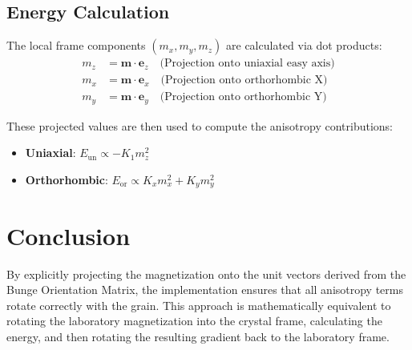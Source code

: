 \documentclass[11pt]{article}
\begin{document}
\subsection{Energy Calculation}
The local frame components $(m_x, m_y, m_z)$ are calculated via dot products:
\begin{align}
    m_z &= \mathbf{m} \cdot \mathbf{e}_z \quad \text{(Projection onto uniaxial easy axis)} \\
    m_x &= \mathbf{m} \cdot \mathbf{e}_x \quad \text{(Projection onto orthorhombic X)} \\
    m_y &= \mathbf{m} \cdot \mathbf{e}_y \quad \text{(Projection onto orthorhombic Y)}
\end{align}

These projected values are then used to compute the anisotropy contributions:
\begin{itemize}
    \item \textbf{Uniaxial}: $E_{\text{un}} \propto -K_1 m_z^2$
    \item \textbf{Orthorhombic}: $E_{\text{or}} \propto K_x m_x^2 + K_y m_y^2$
\end{itemize}

\section{Conclusion}
By explicitly projecting the magnetization onto the unit vectors derived from the Bunge Orientation Matrix, the implementation ensures that all anisotropy terms rotate correctly with the grain. This approach is mathematically equivalent to rotating the laboratory magnetization into the crystal frame, calculating the energy, and then rotating the resulting gradient back to the laboratory frame.
\end{document}
